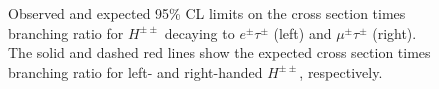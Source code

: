 \begin{figure}[htbp]
  \centering
  \hfill
  \caption{Observed and expected 95\% CL limits on the cross section times branching ratio for $H^{\pm\pm}$ decaying to $e^{\pm}\tau^{\pm}$ (left) and $\mu^{\pm}\tau^{\pm}$ (right). The solid and dashed red lines show the expected cross section times branching ratio for left- and right-handed $H^{\pm\pm}$, respectively.}
  \label{fig:model-independent-dch-limits}
\end{figure}





\printbibliography
